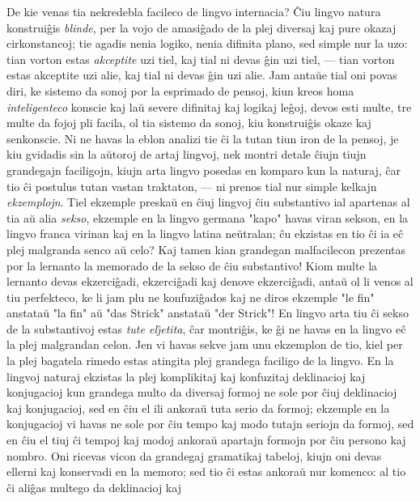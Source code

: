    De kie venas tia nekredebla facileco de lingvo internacia? \^Ciu
lingvo natura konstrui\^gis {\sl blinde}, per la vojo de amasi\^gado
de la plej diversaj kaj pure okazaj cirkonstancoj; tie agadis nenia
logiko, nenia difinita plano, sed simple nur la uzo: tian vorton
estas {\sl akceptite} uzi tiel, kaj tial ni devas \^gin uzi tiel,
--- tian vorton estas akceptite uzi alie, kaj tial ni devas \^gin uzi
alie. Jam anta\u ue tial oni povas diri, ke sistemo da sonoj por la
esprimado de pensoj, kiun kreos homa {\sl inteligenteco} konscie kaj
la\u u severe difinitaj kaj logikaj le\^goj, devos esti multe, tre
multe da fojoj pli facila, ol tia sistemo da sonoj, kiu
konstrui\^gis okaze kaj senkonscie. Ni ne havas la eblon analizi tie
\^ci la tutan tiun iron de la pensoj, je kiu gvidadis sin la a\u
utoroj de artaj lingvoj, nek montri detale \^ciujn tiujn grandegajn
faciligojn, kiujn arta lingvo posedas en komparo kun la naturaj,
\^car tio \^ci postulus tutan vastan traktaton, --- ni prenos tial
nur simple kelkajn {\sl ekzemplojn}. Tiel ekzemple preska\u u en
\^ciuj lingvoj \^ciu substantivo ial apartenas al tia a\u u alia
{\sl sekso}, ekzemple en la lingvo germana "kapo" havas viran
sekson, en la lingvo franca virinan kaj en la lingvo latina ne\u
utralan; \^cu ekzistas en tio \^ci ia e\^c plej malgranda senco a\u
u celo? Kaj tamen kian grandegan malfacilecon prezentas por la
lernanto la memorado de la sekso de \^ciu substantivo! Kiom multe la
lernanto devas ekzerci\^gadi, ekzerci\^gadi kaj denove
ekzerci\^gadi, anta\u u ol li venos al tiu perfekteco, ke li jam plu
ne konfuzi\^gados kaj ne diros ekzemple "le fin" anstata\u u "la
fin" a\u u "das Strick" anstata\u u "der Strick"! En lingvo
arta tiu \^ci sekso de la substantivoj estas {\sl tute
el\^{\j}etita}, \^car montri\^gis, ke \^gi ne havas en la lingvo
e\^c la plej malgrandan celon. Jen vi havas sekve jam unu ekzemplon
de tio, kiel per la plej bagatela rimedo estas atingita plej
grandega faciligo de la lingvo. En la lingvoj naturaj ekzistas la
plej komplikitaj kaj konfuzitaj deklinacioj kaj konjugacioj kun
grandega multo da diversaj formoj ne sole por \^ciuj deklinacioj kaj
konjugacioj, sed en \^ciu el ili ankora\u u tuta serio da formoj;
ekzemple en la konjugacioj vi havas ne sole por \^ciu tempo kaj modo
tutajn seriojn da formoj, sed en \^ciu el tiuj \^ci tempoj kaj modoj
ankora\u u apartajn formojn por \^ciu persono kaj nombro. Oni
ricevas vicon da grandegaj gramatikaj tabeloj, kiujn oni devas
ellerni kaj konservadi en la memoro; sed tio \^ci estas ankora\u u
nur komenco: al tio \^ci ali\^gas multego da deklinacioj kaj
